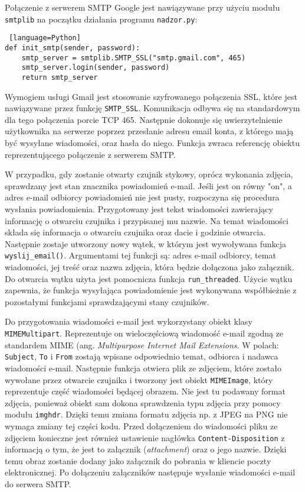 \documentclass[a4paper,12pt,twoside]{article}
\begin{document}
Połączenie z serwerem SMTP Google jest nawiązywane przy użyciu modułu \texttt{smtplib} na początku działania programu \texttt{nadzor.py}: 
\begin{lstlisting} [language=Python]
def init_smtp(sender, password):
    smtp_server = smtplib.SMTP_SSL("smtp.gmail.com", 465)
    smtp_server.login(sender, password)
    return smtp_server 
\end{lstlisting}
Wymogiem usługi Gmail jest stosowanie szyfrowanego połączenia SSL, które jest nawiązywane przez funkcję \texttt{SMTP{\_}SSL}. Komunikacja odbywa się na standardowym dla tego połączenia porcie TCP 465. Następnie dokonuje się uwierzytelnienie użytkownika na serwerze poprzez przesłanie adresu email konta, z którego mają być wysyłane wiadomości, oraz hasła do niego. Funkcja zwraca referencję obiektu reprezentującego połączenie z serwerem SMTP.

W przypadku, gdy zostanie otwarty czujnik stykowy, oprócz wykonania zdjęcia, sprawdzany jest stan znacznika powiadomień e-mail. Jeśli jest on równy "on", a adres e-mail odbiorcy powiadomień nie jest pusty, rozpoczyna się procedura wysłania powiadomienia. Przygotowany jest tekst wiadomości zawierający informację o otwarciu czujnika i przypisanej mu nazwie. Na temat wiadomości składa się informacja o otwarciu czujnika oraz dacie i godzinie otwarcia. Następnie zostaje utworzony nowy wątek, w którym jest wywoływana funkcja \texttt{wyslij{\_}email()}. Argumentami tej funkcji są: adres e-mail odbiorcy, temat wiadomości, jej treść oraz nazwa zdjęcia, która będzie dołączona jako załącznik. Do otwarcia wątku użyta jest pomocnicza funkcja \texttt{run{\_}threaded}. Użycie wątku zapewnia, że funkcja wysyłająca powiadomienie jest wykonywana współbieżnie z pozostałymi funkcjami sprawdzającymi stany czujników.

Do przygotowania wiadomości e-mail jest wykorzystany obiekt klasy \texttt{MIMEMultipart}. Reprezentuje on wieloczęściową wiadomość e-mail zgodną ze standardem MIME (ang. \textit{Multipurpose Internet Mail Extensions}\cite{mime1}\cite{mime2}.  W polach: \texttt{Subject}, \texttt{To} i \texttt{From} zostają wpisane odpowiednio temat, odbiorca i nadawca wiadomości e-mail. Następnie funkcja otwiera plik ze zdjęciem, które zostało wywołane przez otwarcie czujnika i tworzony jest obiekt \texttt{MIMEImage}, który reprezentuje część wiadomości będącej obrazem. Nie jest tu podawany format zdjęcia, ponieważ obiekt sam dokona sprawdzenia typu zdjęcia przy pomocy modułu \texttt{imghdr}\cite{python-mime}. Dzięki temu zmiana formatu zdjęcia np. z JPEG na PNG nie wymaga zmiany tej części kodu. Przed dołączeniem do wiadomości pliku ze zdjęciem konieczne jest również ustawienie nagłówka \texttt{Content-Disposition} z informacją o tym, że jest to załącznik (\textit{attachment}) oraz o jego nazwie. Dzięki temu obraz zostanie dodany jako załącznik do pobrania w kliencie poczty elektronicznej\cite{content-disposition}. Po dołączeniu załączników następuje wysłanie wiadomości e-mail do serwera SMTP.
\newpage
\end{document}
